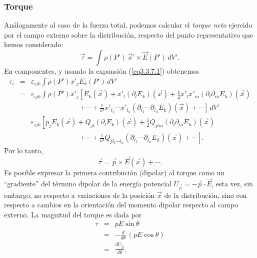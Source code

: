 \subsubsection{Torque}  \label{ed3_3_3}

Análogamente al caso de la fuerza total, podemos calcular el \textit{torque
neto} ejercido por el campo externo sobre la distribución, respecto del punto
representativo que hemos considerado:
\begin{equation}
\vec{\tau} = \int \rho(P')\,\vec{x}'\times\vec{E}(P')\,dV' .
\end{equation}
En componentes, y usando la expansión (\ref{eq3.3.7.1}) obtenemos
\begin{eqnarray}
\tau_i &=& \varepsilon_{ijk}\int\rho(P')x'_jE_k(P')\,dV' \\
&=&\varepsilon_{ijk}\int\rho(P')x'_j\left[
E_k(\vec{x})+x'_l(\partial_lE_k)(\vec{x})+\frac{1}{2}
x'_lx'_m(\partial_l\partial_mE_k)(\vec{x}) \right.\nonumber\\
&&\quad\qquad\qquad\qquad\left.+\cdots+\frac{1}{n!}x'_{i_1}\cdots
x'_{i_n}(\partial_{i_1}\cdots\partial_{i_n}E_k)(\vec
{x})+\cdots\right] \,dV' \\
&=&\varepsilon_{ijk}\left[p_j
E_k(\vec{x})+Q_{jl}(\partial_lE_k)(\vec{x})+\frac{1}{2}
Q_{jlm}(\partial_l\partial_mE_k)(\vec{x})\right.\nonumber\\
&&\quad\qquad\qquad\qquad\left.+\cdots+\frac{1}{n!}Q_{ji_1\cdots i_n}(\partial_{i_1}\cdots\partial_{i_n}
E_k)(\vec
{x})+\cdots\right] .
\end{eqnarray}
Por lo tanto,
\begin{equation}
\label{eq3.3.14}
\boxed{\vec{\tau}=\vec{p}\times\vec{E}(\vec{x})+\cdots. }
\end{equation}
Es posible expresar la primera contribución (dipolar) al torque como un
``gradiente'' del término dipolar de la energía potencial
$U_{\vec{p}}=-\vec{p}\cdot\vec{E}$, esta vez, sin embargo, no respecto a
variaciones de la posición $\vec{x}$ de la distribución, sino con respecto a
cambios en la orientación del momento dipolar respecto al campo
externo. La magnitud del torque es dada por
\begin{eqnarray}
\tau &=& pE\sin\theta \nonumber \\
&=& -\frac{d}{d\theta}\,\left(pE\cos\theta\right)\\
&=&\frac{dU_{\vec{p}}}{d\theta}.  \label{eq3.3.15}
\end{eqnarray}

\newpage


